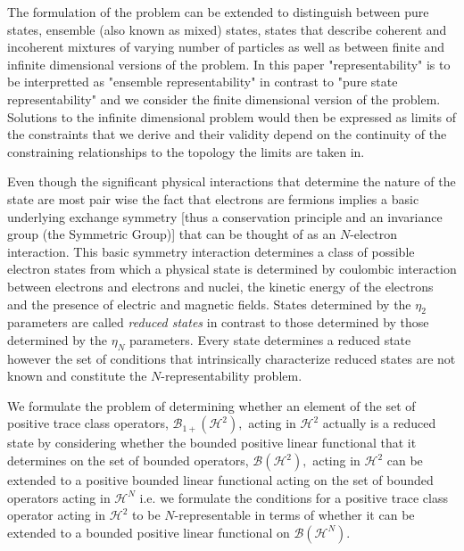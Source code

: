 \documentclass[aps,preprint]{revtex4}%
\begin{document}
The formulation of the problem can be extended to distinguish between pure
states, ensemble (also known as mixed) states, states that describe coherent
and incoherent mixtures of varying number of particles as well as between
finite and infinite dimensional versions of the problem. In this paper
"representability" is to be interpretted as "ensemble representability" in
contrast to "pure state representability" and we consider the finite
dimensional version of the problem. Solutions to the infinite dimensional
problem would then be expressed as limits of the constraints that we derive
and their validity depend on the continuity of the constraining relationships
to the topology the limits are taken in.

Even though the significant physical interactions that determine the nature of
the state are most pair wise the fact that electrons are fermions implies a
basic underlying exchange symmetry [thus a conservation principle and an
invariance group (the Symmetric Group)] that can be thought of as an
$N$-electron interaction. This basic symmetry interaction determines a class
of possible electron states from which a physical state is determined by
coulombic interaction between electrons and electrons and nuclei, the kinetic
energy of the electrons and the presence of electric and magnetic fields.
States determined by the $\eta_{2}$ parameters are called \emph{reduced
states} in contrast to those determined by those determined by the $\eta_{N}$
parameters. Every state determines a reduced state however the set of
conditions that intrinsically characterize reduced states are not known and
constitute the $N$-representability problem.

We formulate the problem of determining whether an element of the set of
positive trace class operators, $\mathcal{B}_{1+}\left(  \mathcal{H}%
^{2}\right)  ,$ acting in $\mathcal{H}^{2}$ actually is a reduced state by
considering whether the bounded positive linear functional that it determines
on the set of bounded operators, $\mathcal{B}\left(  \mathcal{H}^{2}\right)
,$ acting in $\mathcal{H}^{2}$ can be extended to a positive bounded linear
functional acting on the set of bounded operators acting in $\mathcal{H}^{N}$
i.e. we formulate the conditions for a positive trace class operator acting in
$\mathcal{H}^{2}$ to be $N$-representable in terms of whether it can be
extended to a bounded positive linear functional on $\mathcal{B}\left(
\mathcal{H}^{N}\right)  .$
\end{document}
